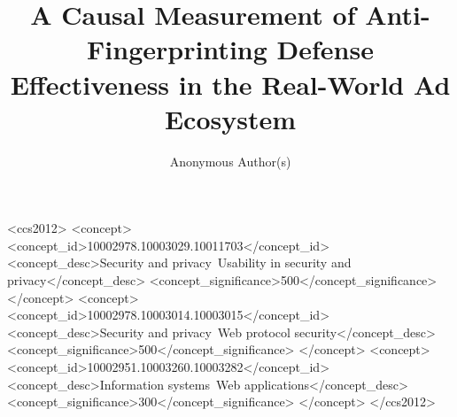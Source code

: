 \documentclass[sigconf,anonymous,review]{acmart}
\begin{document}
\title{A Causal Measurement of Anti-Fingerprinting Defense Effectiveness in the Real-World Ad Ecosystem}

\author{Anonymous Author(s)}
\email{}



\begin{CCSXML}
<ccs2012>
   <concept>
       <concept_id>10002978.10003029.10011703</concept_id>
       <concept_desc>Security and privacy~Usability in security and privacy</concept_desc>
       <concept_significance>500</concept_significance>
   </concept>
   <concept>
       <concept_id>10002978.10003014.10003015</concept_id>
       <concept_desc>Security and privacy~Web protocol security</concept_desc>
       <concept_significance>500</concept_significance>
   </concept>
   <concept>
       <concept_id>10002951.10003260.10003282</concept_id>
       <concept_desc>Information systems~Web applications</concept_desc>
       <concept_significance>300</concept_significance>
   </concept>
 </ccs2012>
\end{CCSXML}



\maketitle










\balance




\appendix

\end{document}

